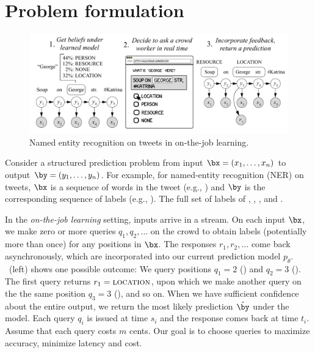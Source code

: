 \section{Problem formulation}
\label{sec:model}

\begin{figure}[t]
  \begin{centering}
  \includegraphics[width=1.0\textwidth]{figures/intro-banner.pdf}
  \end{centering}
  \caption{
    Named entity recognition on tweets in on-the-job learning.
}
\label{fig:crf}
\end{figure}

Consider a structured prediction problem from input $\bx = (x_1, \dots, x_n)$ to output $\by = (y_1, \dots, y_n)$.
For example, for named-entity recognition (NER) on tweets,
$\bx$ is a sequence of words in the tweet (e.g., )
and $\by$ is the corresponding sequence of labels (e.g., \scnone{} \scloc{} \scloc{}).
The full set of labels of \scper{}, \scloc{}, \scres{}, and \scnone{}.

In the \emph{on-the-job learning} setting, inputs arrive in a stream.
On each input $\bx$,
we make zero or more queries $q_1, q_2, \dots$ on the crowd to obtain labels
(potentially more than once)
for any positions in $\bx$.
The responses $r_1, r_2, \dots$ come back asynchronously,
which are incorporated into our current prediction model $p_\theta$.
~(left) shows one possible outcome:
We query positions $q_1 = 2$ () and $q_2=3$ ().
The first query returns $r_1 = \textsc{location}$,
upon which we make another query on the the same position $q_3 = 3$ (),
and so on.
When we have sufficient confidence about the entire output,
we return the most likely prediction $\hat \by$ under the model.
Each query $q_i$ is issued at time $s_i$ and the response comes back at time $t_i$.
Assume that each query costs $m$ cents.
Our goal is to choose queries to maximize accuracy, minimize latency and cost.

